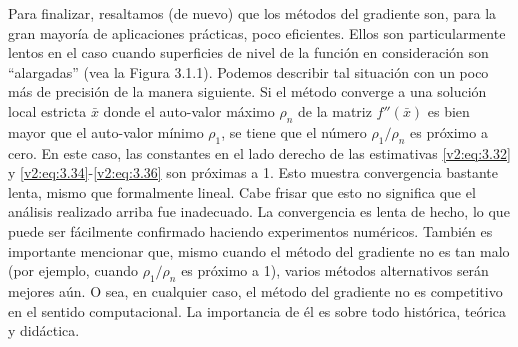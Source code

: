 Para finalizar, resaltamos (de nuevo) que los métodos del gradiente son, para la gran mayoría de aplicaciones prácticas, poco eficientes. Ellos son particularmente lentos en el caso cuando superficies de nivel de la función en consideración son ``alargadas'' (vea la Figura 3.1.1). Podemos describir tal situación con un poco más de precisión de la manera siguiente. Si el método converge a una solución local estricta $\bar{x}$ donde el auto-valor máximo $\rho_n$ de la matriz $f''(\bar{x})$ es bien mayor que el auto-valor mínimo $\rho_1$, se tiene que el número $\rho_1/\rho_n$ es próximo a cero. En este caso, las constantes en el lado derecho de las estimativas \eqref{v2:eq:3.32} y \eqref{v2:eq:3.34}-\eqref{v2:eq:3.36} son próximas a 1. Esto muestra convergencia bastante lenta, mismo que formalmente lineal. Cabe frisar que esto no significa que el análisis realizado arriba fue inadecuado. La convergencia es lenta de hecho, lo que puede ser fácilmente confirmado haciendo experimentos numéricos. También es importante mencionar que, mismo cuando el método del gradiente no es tan malo (por ejemplo, cuando $\rho_1/\rho_n$ es próximo a 1), varios métodos alternativos serán mejores aún. O sea, en cualquier caso, el método del gradiente no es competitivo en el sentido computacional. La importancia de él es sobre todo histórica, teórica y didáctica.

